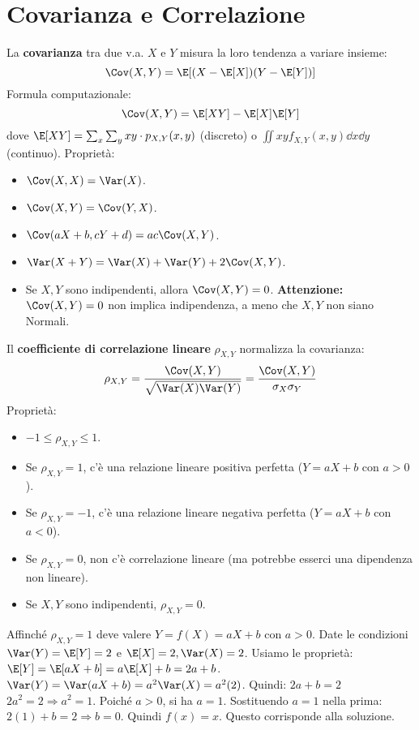 \section{Covarianza e Correlazione}
\begin{definition}[Covarianza]
La \textbf{covarianza} tra due v.a. $X$ e $Y$ misura la loro tendenza a variare insieme:
\[ \Cov(X,Y) = \E[(X-\E[X])(Y-\E[Y])] \]
Formula computazionale:
\[ \Cov(X,Y) = \E[XY] - \E[X]\E[Y] \]
dove $\E[XY] = \sum_x \sum_y xy \cdot p_{X,Y}(x,y)$ (discreto) o $\iint xy f_{X,Y}(x,y) \dd x \dd y$ (continuo).
Proprietà:
\begin{itemize}
    \item $\Cov(X,X) = \Var(X)$.
    \item $\Cov(X,Y) = \Cov(Y,X)$.
    \item $\Cov(aX+b, cY+d) = ac \Cov(X,Y)$.
    \item $\Var(X+Y) = \Var(X) + \Var(Y) + 2\Cov(X,Y)$.
    \item Se $X, Y$ sono indipendenti, allora $\Cov(X,Y) = 0$. \textbf{Attenzione:} $\Cov(X,Y)=0$ non implica indipendenza, a meno che $X,Y$ non siano Normali.
\end{itemize}
\end{definition}

\begin{definition}
Il \textbf{coefficiente di correlazione lineare} $\rho_{X,Y}$ normalizza la covarianza:
\[ \rho_{X,Y} = \frac{\Cov(X,Y)}{\sqrt{\Var(X)\Var(Y)}} = \frac{\Cov(X,Y)}{\sigma_X \sigma_Y} \]
Proprietà:
\begin{itemize}
    \item $-1 \le \rho_{X,Y} \le 1$.
    \item Se $\rho_{X,Y} = 1$, c'è una relazione lineare positiva perfetta ($Y=aX+b$ con $a>0$).
    \item Se $\rho_{X,Y} = -1$, c'è una relazione lineare negativa perfetta ($Y=aX+b$ con $a<0$).
    \item Se $\rho_{X,Y} = 0$, non c'è correlazione lineare (ma potrebbe esserci una dipendenza non lineare).
    \item Se $X,Y$ sono indipendenti, $\rho_{X,Y}=0$.
\end{itemize}
\end{definition}
\begin{example}
Affinché $\rho_{X,Y}=1$ deve valere $Y = f(X) = aX+b$ con $a>0$.
Date le condizioni $\Var(Y) = \E[Y]=2$ e $\E[X]=2, \Var(X)=2$.
Usiamo le proprietà:
$\E[Y] = \E[aX+b] = a\E[X]+b = 2a+b$.
$\Var(Y) = \Var(aX+b) = a^2\Var(X) = a^2(2)$.
Quindi:
$2a+b = 2$
$2a^2 = 2 \Rightarrow a^2 = 1$. Poiché $a>0$, si ha $a=1$.
Sostituendo $a=1$ nella prima: $2(1)+b=2 \Rightarrow b=0$.
Quindi $f(x) = x$. Questo corrisponde alla soluzione.
\end{example}

